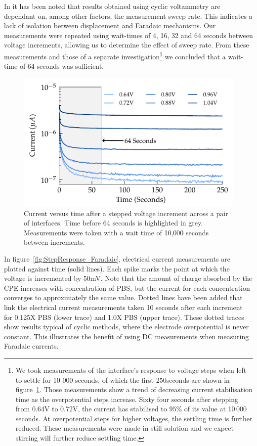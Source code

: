 \documentclass[journal, a4paper]{IEEEtran}
\begin{document}
In \cite{Cogan2008} it has been noted that results obtained using cyclic voltammetry are dependant on, among other factors, the measurement sweep rate. This indicates a lack of isolation between displacement and Faradaic mechanisms. Our measurements were repeated using wait-times of 4, 16, 32 and 64 seconds between voltage increments, allowing us to determine the effect of sweep rate. From these measurements and those of a separate investigation\footnote{We took measurements of the interface's response to voltage steps when left to settle for 10 000 seconds, of which the first 250\thinspace seconds are shown in figure~\ref{fig:CPE_currentVsTime}. Those measurements show a trend of decreasing current stabilisation time as the overpotential steps increase. Sixty four seconds after stepping from 0.64\thinspace V to 0.72\thinspace V, the current has stabilised to $95\%$ of its value at 10\,000 seconds. At overpotential steps for higher voltages, the settling time is further reduced. These measurements were made in still solution and we expect stirring will further reduce settling time.} we concluded that a wait-time of 64 seconds was sufficient.

\begin{figure}
    \begin{center}
        \includegraphics{graphics/CPE_currentVsTime}
    \end{center}
    \caption{Current versus time after a stepped voltage increment across a pair of interfaces. Time before 64 seconds is highlighted in grey. Measurements were taken with a wait time of 10,000 seconds between increments.}
    \label{fig:CPE_currentVsTime}
\end{figure}

In figure~\ref{fig:StepResponse_Faradaic}, electrical current measurements are plotted against time (solid lines). Each spike marks the point at which the voltage is incremented by 50\thinspace mV. Note that the amount of charge absorbed by the CPE increases with concentration of PBS, but the current for each concentration converges to approximately the same value. Dotted lines have been added that link the electrical current measurements taken 10 seconds after each increment for 0.125X PBS (lower trace) and 1.0X PBS (upper trace). These dotted traces show results typical of cyclic methods, where the electrode overpotential is never constant. This illustrates the benefit of using DC measurements when measuring Faradaic currents.
\end{document}
